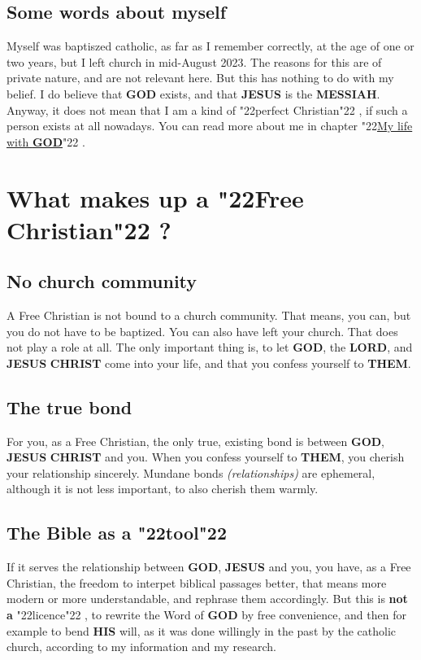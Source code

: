 \documentclass[12pt,a4paper]{article}
\newcommand{\Christ}[0]{\textbf{CHRIST}}
\newcommand{\God}[0]{\textbf{GOD}}
\newcommand{\His}[0]{\textbf{HIS}}
\newcommand{\Jesus}[0]{\textbf{JESUS}}
\newcommand{\Lord}[0]{\textbf{LORD}}
\newcommand{\Messiah}[0]{\textbf{MESSIAH}}
\newcommand{\Them}[0]{\textbf{THEM}}
\newcommand{\q}[1]{\char"22{#1}\char"22 }
\begin{document}
	\subsection{Some words about myself}
		Myself was baptiszed catholic,
		as far as I remember correctly,
		at the age of one or two years,
		but I left church in mid-August 2023.
		The reasons for this are of private nature,
		and are not relevant here.
		But this has nothing to do with my belief.
		I do believe that {\God} exists,
		and that {\Jesus} is the {\Messiah}.
		Anyway,
		it does not mean that I am a kind of \q{perfect Christian},
		if such a person exists at all nowadays.
		You can read more about me in chapter \q{\hyperref[MeinLebenMitGott]{My life with {\God}}}.
	
	\newpage
	\section{What makes up a \q{Free Christian}?}
	
	\subsection{No church community}
		A Free Christian is not bound to a church community.
		That means,
		you can,
		but you do not have to be baptized.
		You can also have left your church.
		That does not play a role at all.
		The only important thing is,
		to let {\God},
		the {\Lord},
		and {\Jesus} {\Christ} come into your life,
		and that you confess yourself to {\Them}.
	
	\subsection{The true bond}
		For you,
		as a Free Christian,
		the only true,
		existing bond is between {\God},
		{\Jesus} {\Christ} and you.
		When you confess yourself to {\Them},
		you cherish your relationship sincerely.
		Mundane bonds \textit{(relationships)} are ephemeral,
		although it is not less important,
		to also cherish them warmly.
			
	\subsection{The Bible as a \q{tool}}
		If it serves the relationship between {\God},
		{\Jesus} and you,
		you have,
		as a Free Christian,
		the freedom to interpet biblical passages better,
		that means more modern or more understandable,
		and rephrase them accordingly.
		But this is \textbf{not a} \q{licence},
		to rewrite the Word of {\God} by free convenience,
		and then for example to bend {\His} will,
		as it was done willingly in the past by the catholic church,
		according to my information and my research.
		
\end{document}

